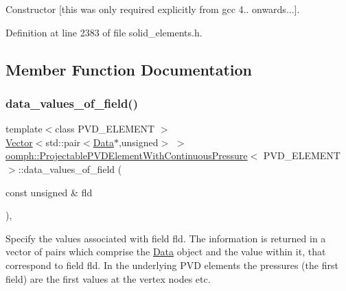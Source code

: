 Constructor \mbox{[}this was only required explicitly from gcc 4.. onwards...\mbox{]}. 



Definition at line 2383 of file solid\+\_\+elements.\+h.



\subsection{Member Function Documentation}
\mbox{\label{classoomph_1_1ProjectablePVDElementWithContinuousPressure_ab36cf9002b4eba6b706379b609979c52}} 
\subsubsection{\texorpdfstring{data\+\_\+values\+\_\+of\+\_\+field()}{data\_values\_of\_field()}}
{\footnotesize\ttfamily template$<$class P\+V\+D\+\_\+\+E\+L\+E\+M\+E\+NT $>$ \\
\hyperlink{classoomph_1_1Vector}{Vector}$<$std\+::pair$<$\hyperlink{classoomph_1_1Data}{Data}$\ast$,unsigned$>$ $>$ \hyperlink{classoomph_1_1ProjectablePVDElementWithContinuousPressure}{oomph\+::\+Projectable\+P\+V\+D\+Element\+With\+Continuous\+Pressure}$<$ P\+V\+D\+\_\+\+E\+L\+E\+M\+E\+NT $>$\+::data\+\_\+values\+\_\+of\+\_\+field (\begin{DoxyParamCaption}\item[{const unsigned \&}]{fld }\end{DoxyParamCaption})\hspace{0.3cm}{\ttfamily [inline]}, {\ttfamily [virtual]}}



Specify the values associated with field fld. The information is returned in a vector of pairs which comprise the \hyperlink{classoomph_1_1Data}{Data} object and the value within it, that correspond to field fld. In the underlying P\+VD elements the pressures (the first field) are the first values at the vertex nodes etc. 



